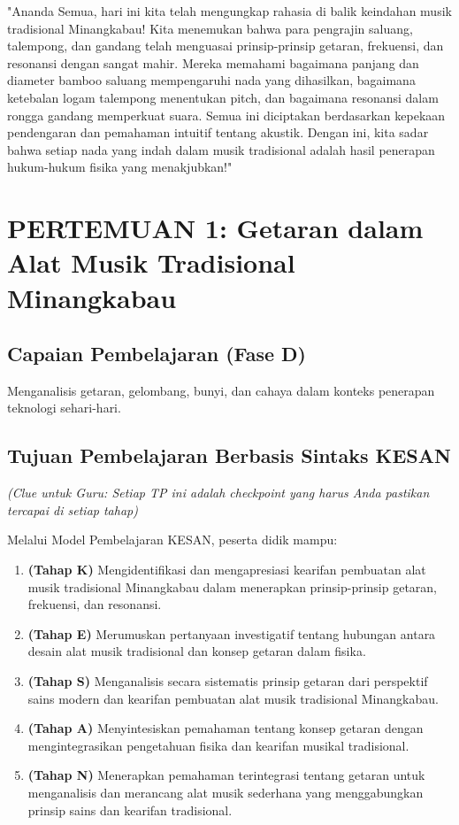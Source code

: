 \documentclass[12pt,a4paper]{article}
\begin{document}
\begin{tcolorbox}[mystyle]
"Ananda Semua, hari ini kita telah mengungkap rahasia di balik keindahan musik tradisional Minangkabau! Kita menemukan bahwa para pengrajin saluang, talempong, dan gandang telah menguasai prinsip-prinsip getaran, frekuensi, dan resonansi dengan sangat mahir. Mereka memahami bagaimana panjang dan diameter bamboo saluang mempengaruhi nada yang dihasilkan, bagaimana ketebalan logam talempong menentukan pitch, dan bagaimana resonansi dalam rongga gandang memperkuat suara. Semua ini diciptakan berdasarkan kepekaan pendengaran dan pemahaman intuitif tentang akustik. Dengan ini, kita sadar bahwa setiap nada yang indah dalam musik tradisional adalah hasil penerapan hukum-hukum fisika yang menakjubkan!"
\end{tcolorbox}

\section{PERTEMUAN 1: Getaran dalam Alat Musik Tradisional Minangkabau}

\subsection{Capaian Pembelajaran (Fase D)}
Menganalisis getaran, gelombang, bunyi, dan cahaya dalam konteks penerapan teknologi sehari-hari.

\subsection{Tujuan Pembelajaran Berbasis Sintaks KESAN}
\textit{(Clue untuk Guru: Setiap TP ini adalah checkpoint yang harus Anda pastikan tercapai di setiap tahap)}

Melalui Model Pembelajaran KESAN, peserta didik mampu:

\begin{enumerate}
\item \textbf{(Tahap K)} Mengidentifikasi dan mengapresiasi kearifan pembuatan alat musik tradisional Minangkabau dalam menerapkan prinsip-prinsip getaran, frekuensi, dan resonansi.
\item \textbf{(Tahap E)} Merumuskan pertanyaan investigatif tentang hubungan antara desain alat musik tradisional dan konsep getaran dalam fisika.
\item \textbf{(Tahap S)} Menganalisis secara sistematis prinsip getaran dari perspektif sains modern dan kearifan pembuatan alat musik tradisional Minangkabau.
\item \textbf{(Tahap A)} Menyintesiskan pemahaman tentang konsep getaran dengan mengintegrasikan pengetahuan fisika dan kearifan musikal tradisional.
\item \textbf{(Tahap N)} Menerapkan pemahaman terintegrasi tentang getaran untuk menganalisis dan merancang alat musik sederhana yang menggabungkan prinsip sains dan kearifan tradisional.
\end{enumerate}
\end{document}
